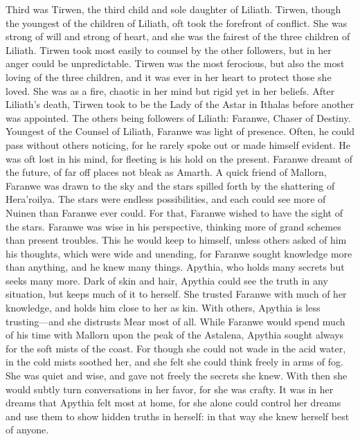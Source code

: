 \documentclass[smalldemyvopaper,11pt,twoside,onecolumn,openright,extrafontsizes]{memoir}
\begin{document}
Third was Tirwen, the third child and sole daughter of Liliath. Tirwen, though the youngest of the children of Liliath, oft took the forefront of conflict. She was strong of will and strong of heart, and she was the fairest of the three children of Liliath. Tirwen took most easily to counsel by the other followers, but in her anger could be unpredictable. Tirwen was the most ferocious, but also the most loving of the three children, and it was ever in her heart to protect those she loved. She was as a fire, chaotic in her mind but rigid yet in her beliefs. After Liliath’s death, Tirwen took to be the Lady of the Astar in Ithalas before another was appointed.
The others being followers of Liliath:
Faranwe, Chaser of Destiny. Youngest of the Counsel of Liliath, Faranwe was light of presence. Often, he could pass without others noticing, for he rarely spoke out or made himself evident. He was oft lost in his mind, for fleeting is his hold on the present. Faranwe dreamt of the future, of far off places not bleak as Amarth. A quick friend of Mallorn, Faranwe was drawn to the sky and the stars spilled forth by the shattering of Hera’roilya. The stars were endless possibilities, and each could see more of Nuinen than Faranwe ever could. For that, Faranwe wished to have the sight of the stars. Faranwe was wise in his perspective, thinking more of grand schemes than present troubles. This he would keep to himself, unless others asked of him his thoughts, which were wide and unending, for Faranwe sought knowledge more than anything, and he knew many things.
Apythia, who holds many secrets but seeks many more. Dark of skin and hair, Apythia could see the truth in any situation, but keeps much of it to herself. She trusted Faranwe with much of her knowledge, and holds him close to her as kin. With others, Apythia is less trusting—and she distrusts Mear most of all. While Faranwe would spend much of his time with Mallorn upon the peak of the Astalena, Apythia sought always for the soft mists of the coast. For though she could not wade in the acid water, in the cold mists soothed her, and she felt she could think freely in arms of fog. She was quiet and wise, and gave not freely the secrets she knew. With then she would subtly turn conversations in her favor, for she was crafty. It was in her dreams that Apythia felt most at home, for she alone could control her dreams and use them to show hidden truths in herself: in that way she knew herself best of anyone.
\end{document}
